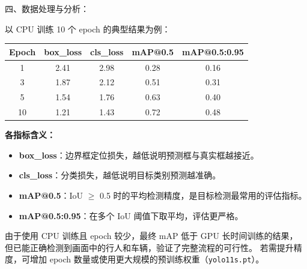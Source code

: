 \documentclass[12pt, a4paper]{article}
\begin{document}
 
\begin{labbox}{四、数据处理与分析：}{}
 
以 CPU 训练 10 个 epoch 的典型结果为例：
 
\vspace{0.3cm}
\begin{center}
\begin{tabular}{|c|c|c|c|c|}
    \hline
    \textbf{Epoch} & \textbf{box\_loss} & \textbf{cls\_loss} & \textbf{mAP@0.5} & \textbf{mAP@0.5:0.95} \\
    \hline
    1  & 2.41 & 2.98 & 0.28 & 0.16 \\
    3  & 1.87 & 2.12 & 0.51 & 0.31 \\
    5  & 1.54 & 1.76 & 0.63 & 0.40 \\
    10 & 1.21 & 1.43 & 0.72 & 0.48 \\
    \hline
\end{tabular}
\end{center}
\vspace{0.3cm}
 
\textbf{各指标含义：}
\begin{itemize}[leftmargin=2em, itemsep=0.2em]
    \item \textbf{box\_loss}：边界框定位损失，越低说明预测框与真实框越接近。
    \item \textbf{cls\_loss}：分类损失，越低说明目标类别预测越准确。
    \item \textbf{mAP@0.5}：IoU $\geq$ 0.5 时的平均检测精度，是目标检测最常用的评估指标。
    \item \textbf{mAP@0.5:0.95}：在多个 IoU 阈值下取平均，评估更严格。
\end{itemize}
 
\vspace{0.2cm}
由于使用 CPU 训练且 epoch 较少，最终 mAP 低于 GPU 长时间训练的结果，
但已能正确检测到画面中的行人和车辆，验证了完整流程的可行性。
若需提升精度，可增加 epoch 数量或使用更大规模的预训练权重（\texttt{yolo11s.pt}）。
 
\end{labbox}
 
\end{document}
